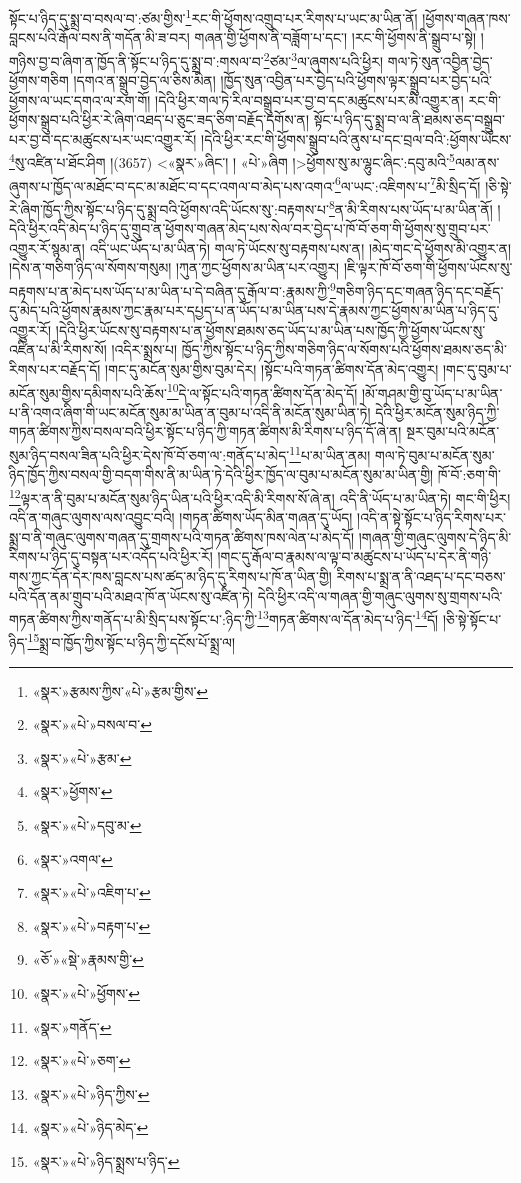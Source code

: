 སྟོང་པ་ཉིད་དུ་སྨྲ་བ་བསལ་བ་:ཙམ་གྱིས་\footnote{«སྣར་»རྩམས་ཀྱིས་«པེ་»རྩམ་གྱིས་}རང་གི་ཕྱོགས་འགྲུབ་པར་རིགས་པ་ཡང་མ་ཡིན་ནོ། །ཕྱོགས་གཞན་ཁས་བླངས་པའི་རྒོལ་བས་ནི་གདོན་མི་ཟ་བར། གཞན་གྱི་ཕྱོགས་ནི་བཟློག་པ་དང་། །རང་གི་ཕྱོགས་ནི་སྒྲུབ་པ་སྟེ། །གཉིས་བྱ་བ་ཞིག་ན་ཁྱོད་ནི་སྟོང་པ་ཉིད་དུ་སྨྲ་བ་:གསལ་བ་\footnote{«སྣར་»«པེ་»བསལ་བ་}ཙམ་\footnote{«སྣར་»«པེ་»རྩམ་}ལ་ཞུགས་པའི་ཕྱིར། གལ་ཏེ་སུན་འབྱིན་བྱེད་ཕྱོགས་གཅིག །དགའ་ན་སྒྲུབ་བྱེད་ལ་ཅིས་མིན། །ཁྱོད་སུན་འབྱིན་པར་བྱེད་པའི་ཕྱོགས་ལྟར་སྒྲུབ་པར་བྱེད་པའི་ཕྱོགས་ལ་ཡང་དགའ་ལ་རག་གོ། །དེའི་ཕྱིར་གལ་ཏེ་རིལ་བསྒྲུབ་པར་བྱ་བ་དང་མཚུངས་པར་མི་འགྱུར་ན། རང་གི་ཕྱོགས་སྒྲུབ་པའི་ཕྱིར་རེ་ཞིག་འཐད་པ་ཅུང་ཟད་ཅིག་བརྗོད་དགོས་ན། སྟོང་པ་ཉིད་དུ་སྨྲ་བ་ལ་ནི་ཐམས་ཅད་བསྒྲུབ་པར་བྱ་བ་དང་མཚུངས་པར་ཡང་འགྱུར་རོ། །དེའི་ཕྱིར་རང་གི་ཕྱོགས་སྒྲུབ་པའི་ནུས་པ་དང་བྲལ་བའི་:ཕྱོགས་ཡོངས་\footnote{«སྣར་»ཕྱོགས་}སུ་འཛིན་པ་ཐོང་ཤིག །(3657) <«སྣར་»ཞིང་། །
«པེ་»ཞིག །>ཕྱོགས་སུ་མ་ལྷུང་ཞིང་:དབུ་མའི་\footnote{«སྣར་»«པེ་»དབུ་མ་}ལམ་ནས་ཞུགས་པ་ཁྱོད་ལ་མཐོང་བ་དང་མ་མཐོང་བ་དང་འགལ་བ་མེད་པས་འགའ་\footnote{«སྣར་»འགལ་}ལ་ཡང་:འཇིགས་པ་\footnote{«སྣར་»«པེ་»འཇིག་པ་}མི་སྲིད་དོ། །ཅི་སྟེ་རེ་ཞིག་ཁྱོད་ཀྱིས་སྟོང་པ་ཉིད་དུ་སྨྲ་བའི་ཕྱོགས་འདི་ཡོངས་སུ་:བརྟགས་པ་\footnote{«སྣར་»«པེ་»བརྟག་པ་}ན་མི་རིགས་པས་ཡོད་པ་མ་ཡིན་ནོ། །དེའི་ཕྱིར་འདི་མེད་པ་ཉིད་དུ་གྲུབ་ན་ཕྱོགས་གཞན་མེད་པས་སེལ་བར་བྱེད་པ་ཁོ་བོ་ཅག་གི་ཕྱོགས་སུ་གྲུབ་པར་འགྱུར་རོ་སྙམ་ན། འདི་ཡང་ཡོད་པ་མ་ཡིན་ཏེ། གལ་ཏེ་ཡོངས་སུ་བརྟགས་པས་ན། །མེད་གང་དེ་ཕྱོགས་མི་འགྱུར་ན། །དེས་ན་གཅིག་ཉིད་ལ་སོགས་གསུམ། །ཀུན་ཀྱང་ཕྱོགས་མ་ཡིན་པར་འགྱུར། །ཇི་ལྟར་ཁོ་བོ་ཅག་གི་ཕྱོགས་ཡོངས་སུ་བརྟགས་པ་ན་མེད་པས་ཡོད་པ་མ་ཡིན་པ་དེ་བཞིན་དུ་རྒོལ་བ་:རྣམས་ཀྱི་\footnote{«ཅོ་»«སྡེ་»རྣམས་གྱི་}གཅིག་ཉིད་དང་གཞན་ཉིད་དང་བརྗོད་དུ་མེད་པའི་ཕྱོགས་རྣམས་ཀྱང་རྣམ་པར་དཔྱད་པ་ན་ཡོད་པ་མ་ཡིན་པས་དེ་རྣམས་ཀྱང་ཕྱོགས་མ་ཡིན་པ་ཉིད་དུ་འགྱུར་རོ། །དེའི་ཕྱིར་ཡོངས་སུ་བརྟགས་པ་ན་ཕྱོགས་ཐམས་ཅད་ཡོད་པ་མ་ཡིན་པས་ཁྱོད་ཀྱི་ཕྱོགས་ཡོངས་སུ་འཛིན་པ་མི་རིགས་སོ། །འདིར་སྨྲས་པ། ཁྱོད་ཀྱིས་སྟོང་པ་ཉིད་ཀྱིས་གཅིག་ཉིད་ལ་སོགས་པའི་ཕྱོགས་ཐམས་ཅད་མི་རིགས་པར་བརྗོད་དོ། །གང་དུ་མངོན་སུམ་གྱིས་བུམ་དེར། །སྟོང་པའི་གཏན་ཚིགས་དོན་མེད་འགྱུར། །གང་དུ་བུམ་པ་མངོན་སུམ་གྱིས་དམིགས་པའི་ཆོས་\footnote{«སྣར་»«པེ་»ཕྱོགས་}དེ་ལ་སྟོང་པའི་གཏན་ཚིགས་དོན་མེད་དོ། །མོ་གཤམ་གྱི་བུ་ཡོད་པ་མ་ཡིན་པ་ནི་འགའ་ཞིག་གི་ཡང་མངོན་སུམ་མ་ཡིན་ན་བུམ་པ་འདི་ནི་མངོན་སུམ་ཡིན་ཏེ། དེའི་ཕྱིར་མངོན་སུམ་ཉིད་ཀྱི་གཏན་ཚིགས་ཀྱིས་བསལ་བའི་ཕྱིར་སྟོང་པ་ཉིད་ཀྱི་གཏན་ཚིགས་མི་རིགས་པ་ཉིད་དོ་ཞེ་ན། སྔར་བུམ་པའི་མངོན་སུམ་ཉིད་བསལ་ཟིན་པའི་ཕྱིར་དེས་ཁོ་བོ་ཅག་ལ་:གནོད་པ་མེད་\footnote{«སྣར་»གནོད་}པ་མ་ཡིན་ནམ། གལ་ཏེ་བུམ་པ་མངོན་སུམ་ཉིད་ཁྱོད་ཀྱིས་བསལ་གྱི་བདག་གིས་ནི་མ་ཡིན་ཏེ་དེའི་ཕྱིར་ཁྱོད་ལ་བུམ་པ་མངོན་སུམ་མ་ཡིན་གྱི། ཁོ་བོ་:ཅག་གི་\footnote{«སྣར་»«པེ་»ཅག་}ལྟར་ན་ནི་བུམ་པ་མངོན་སུམ་ཉིད་ཡིན་པའི་ཕྱིར་འདི་མི་རིགས་སོ་ཞེ་ན། འདི་ནི་ཡོད་པ་མ་ཡིན་ཏེ། གང་གི་ཕྱིར། འདི་ན་གཞུང་ལུགས་ལས་འབྱུང་བའི། །གཏན་ཚིགས་ཡོད་མིན་གཞན་དུ་ཡོད། །འདི་ན་སྟེ་སྟོང་པ་ཉིད་རིགས་པར་སྨྲ་བ་ནི་གཞུང་ལུགས་གཞན་དུ་གྲགས་པའི་གཏན་ཚིགས་ཁས་ལེན་པ་མེད་དོ། །གཞན་གྱི་གཞུང་ལུགས་དེ་ཉིད་མི་རིགས་པ་ཉིད་དུ་བསྟན་པར་འདོད་པའི་ཕྱིར་རོ། །གང་དུ་རྒོལ་བ་རྣམས་ལ་ལྟ་བ་མཚུངས་པ་ཡོད་པ་དེར་ནི་གཉི་གས་ཀྱང་དོན་དེར་ཁས་བླངས་པས་ཚད་མ་ཉིད་དུ་རིགས་པ་ཁོ་ན་ཡིན་གྱི། རིགས་པ་སྨྲ་ན་ནི་འཐད་པ་དང་བཅས་པའི་དོན་ནམ་གྲུབ་པའི་མཐའ་ཁོ་ན་ཡོངས་སུ་འཛིན་ཏེ། དེའི་ཕྱིར་འདི་ལ་གཞན་གྱི་གཞུང་ལུགས་སུ་གྲགས་པའི་གཏན་ཚིགས་ཀྱིས་གནོད་པ་མི་སྲིད་པས་སྟོང་པ་:ཉིད་ཀྱི་\footnote{«སྣར་»«པེ་»ཉིད་ཀྱིས་}གཏན་ཚིགས་ལ་དོན་མེད་པ་ཉིད་\footnote{«སྣར་»«པེ་»ཉིད་མེད་}དོ། །ཅི་སྟེ་སྟོང་པ་ཉིད་\footnote{«སྣར་»«པེ་»ཉིད་སྨྲས་པ་ཉིད་}སྨྲ་བ་ཁྱོད་ཀྱིས་སྟོང་པ་ཉིད་ཀྱི་དངོས་པོ་སྨྲ་ལ། 
